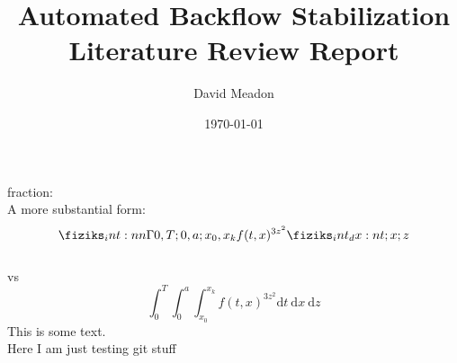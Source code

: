 \documentclass{article}
\title{Automated Backflow Stabilization\\
{\small Literature Review Report}}
\author{David Meadon}
\date{\today}
\begin{document}
\maketitle
fraction: \\
\noindent
A more substantial form: \[\Int[0,T;0,a;x_0, x_k]{f(t, x)^{3z^{2}}}[t;x;z]\]\\
vs \\
\[ \int^{T}_{0} \int^{a}_{0} \int^{x_k}_{x_0} f(t,x)^{3z^2} \text{d}t\ \text{d}x\ \text{d}z \]
This is some text.\\
Here I am just testing git stuff
\end{document}
